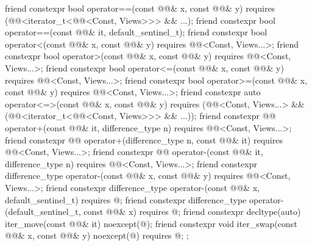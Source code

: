 \begin{codeblock}
{{    friend constexpr bool operator==(const @@& x, const @@& y)
      requires (@@<iterator_t<@@<Const, Views>>> && ...);
    friend constexpr bool operator==(const @@& it, default_sentinel_t);
    friend constexpr bool operator<(const @@& x, const @@& y)
      requires @@<Const, Views...>;
    friend constexpr bool operator>(const @@& x, const @@& y)
      requires @@<Const, Views...>;
    friend constexpr bool operator<=(const @@& x, const @@& y)
      requires @@<Const, Views...>;
    friend constexpr bool operator>=(const @@& x, const @@& y)
      requires @@<Const, Views...>;
    friend constexpr auto operator<=>(const @@& x, const @@& y)
      requires (@@<Const, Views...> &&
                (@@<iterator_t<@@<Const, Views>>> && ...));
    friend constexpr @@ operator+(const @@& it, difference_type n)
      requires @@<Const, Views...>;
    friend constexpr @@ operator+(difference_type n, const @@& it)
      requires @@<Const, Views...>;
    friend constexpr @@ operator-(const @@& it, difference_type n)
      requires @@<Const, Views...>;
    friend constexpr difference_type operator-(const @@& x, const @@& y)
      requires @@<Const, Views...>;
    friend constexpr difference_type operator-(const @@& x, default_sentinel_t)
      requires @\seebelow@;
    friend constexpr difference_type operator-(default_sentinel_t, const @@& x)
      requires @\seebelow@;
    friend constexpr decltype(auto) iter_move(const @@& it) noexcept(@\seebelow@);
    friend constexpr void iter_swap(const @@& x, const @@& y) noexcept(@\seebelow@)
      requires @\seebelow@;
  };
}
\end{codeblock}

